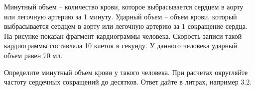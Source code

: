 
Минутный
объем – количество крови, которое выбрасывается сердцем в аорту или легочную
артерию за 1 минуту. Ударный объем – объем крови, который выбрасывается сердцем
в аорту или легочную артерию за 1 сокращение сердца. На рисунке показан
фрагмент кардиограммы человека. Скорость записи такой кардиограммы составляла
10  клеток в секунду.  У данного человека
ударный объем равен 70  мл.


Определите минутный объем крови у такого человека.
При расчетах округляйте частоту сердечных сокращений до десятков. Ответ дайте в
литрах, например 3.2. 

